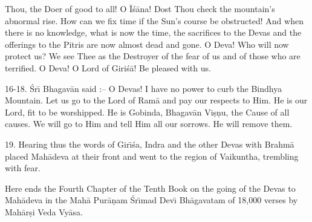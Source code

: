 Thou, the Doer of good to all! O \=I\'s\=ana! Dost Thou check the mountain's abnormal rise. How can we fix time if the Sun's course be obstructed! And when there is no knowledge, what is now the time, the sacrifices to the Devas and the offerings to the Pitris are now almost dead and gone. O Deva! Who will now protect us? We see Thee as the Destroyer of the fear of us and of those who are terrified. O Deva! O Lord of Giri\'s\=a! Be pleased with us.

16-18. \'Sr\={\i} Bhagav\=an said :-- O Devas! I have no power to curb the Bindhya Mountain. Let us go to the Lord of Ram\=a and pay our respects to Him. He is our Lord, fit to be worshipped. He is Gobinda, Bhagav\=an Vi\d{s}\d{n}u, the Cause of all causes. We will go to Him and tell Him all our sorrows. He will remove them.

19. Hearing thus the words of Gir\={\i}\'sa, Indra and the other Devas with Brahm\=a placed Mah\=adeva at their front and went to the region of Vaikuntha, trembling with fear.

Here ends the Fourth Chapter of the Tenth Book on the going of the Devas to Mah\=adeva in the Mah\=a Pur\=a\d{n}am \'Sr\={\i}mad Dev\={\i} Bh\=agavatam of 18,000 verses by Mah\=ar\d{s}i Veda Vy\=asa.



